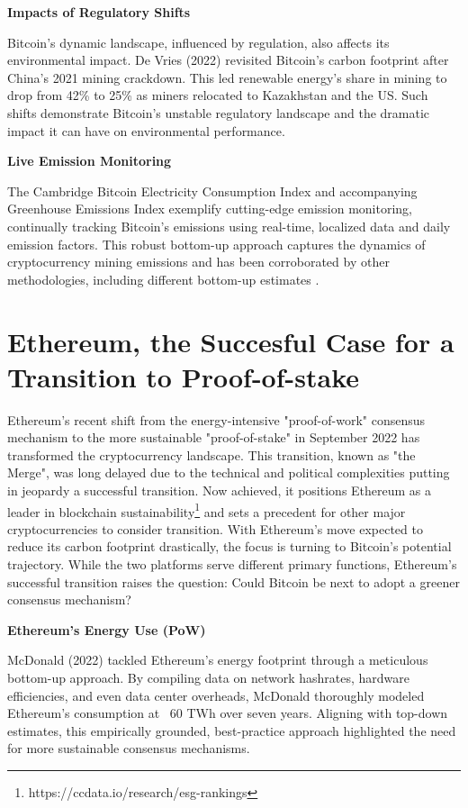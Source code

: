 \documentclass[11pt]{report}
\begin{document}
\textbf{Impacts of Regulatory Shifts}


Bitcoin's dynamic landscape, influenced by regulation, also affects its environmental impact. De Vries (2022)\cite{devriesRevisitingBitcoinCarbon2022}  revisited Bitcoin's carbon footprint after China's 2021 mining crackdown. This led renewable energy's share in mining to drop from 42\% to 25\% as miners relocated to Kazakhstan and the US. Such shifts demonstrate Bitcoin's unstable regulatory landscape and the dramatic impact it can have on environmental performance.

\textbf{Live Emission Monitoring}

The Cambridge Bitcoin Electricity Consumption Index \cite{neumuellerCambridgeBitcoinElectricity2021} and accompanying Greenhouse Emissions Index
exemplify cutting-edge emission monitoring, continually tracking Bitcoin's emissions using real-time, localized data and daily emission factors. This robust bottom-up approach captures the dynamics of cryptocurrency mining emissions and has been corroborated by other methodologies, including different bottom-up estimates \cite{mcdonaldEthereumEmissionsBottomup2022}.

\section{Ethereum, the Succesful Case for a Transition to Proof-of-stake \label{sec:ethereum_transition}}

Ethereum's recent shift from the energy-intensive "proof-of-work" consensus mechanism to the more sustainable "proof-of-stake" in September 2022 has transformed the cryptocurrency landscape. This transition, known as "the Merge", was long delayed due to the technical and political complexities putting in jeopardy a successful transition\cite{bloombergnewsEthereumMergeYour2022}. Now achieved, it positions Ethereum as a leader in blockchain sustainability\footnote{https://ccdata.io/research/esg-rankings} and sets a precedent for other major cryptocurrencies to consider transition. With Ethereum's move expected to reduce its carbon footprint drastically, the focus is turning to Bitcoin's potential trajectory. While the two platforms serve different primary functions, Ethereum's successful transition raises the question: Could Bitcoin be next to adopt a greener consensus mechanism?


\textbf{Ethereum's Energy Use (PoW)}

McDonald (2022)\cite{mcdonaldEthereumEmissionsBottomup2022} tackled Ethereum's energy footprint through a meticulous bottom-up approach. By compiling data on network hashrates, hardware efficiencies, and even data center overheads, McDonald thoroughly modeled Ethereum's consumption at ~60 TWh over seven years. Aligning with top-down estimates, this empirically grounded, best-practice approach highlighted the need for more sustainable consensus mechanisms.
\end{document}
